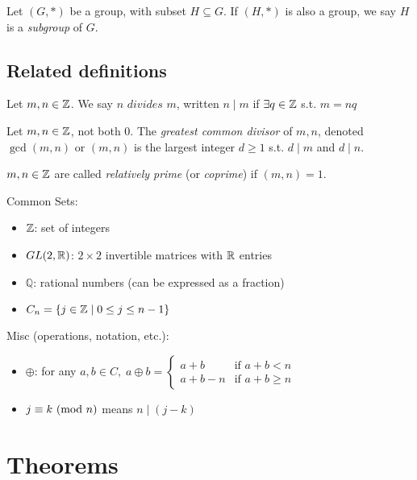  Let $(G, \ast)$ be a group, with subset $H \subseteq G$. If $(H, \ast)$ is also a group, we say $H$ is a \textit{subgroup} of $G$.

\subsection*{Related definitions}

 Let $m, n \in \mathbb{Z}$. We say $n \textit{ divides } m$, written $n \mid m$ if $\exists q \in \mathbb{Z}$ s.t. $m = nq$

 Let $m, n \in \mathbb{Z}$, not both $0$. The \textit{greatest common divisor} of $m, n$, denoted $\gcd(m, n)$ or $(m, n)$ is the largest integer $d \ge 1$ s.t. $d \mid m$ and $d \mid n$.

 $m, n \in \mathbb{Z}$ are called \textit{relatively prime} (or \textit{coprime}) if $(m, n) = 1$. 

\bigskip 

\noindent
Common Sets:
\begin{itemize}
    \item $\mathbb{Z}$: set of integers 
    \item $GL(2, \mathbb{R})$: $2 \times 2$ invertible matrices with $\mathbb{R}$ entries
    \item $\mathbb{Q}$: rational numbers (can be expressed as a fraction)
    \item $C_n = \{j \in \mathbb{Z} \mid 0 \le j \le n - 1 \}$
\end{itemize}

\bigskip

\noindent
Misc (operations, notation, etc.):
\begin{itemize}
    \item $\oplus$: for any $a, b \in C, \; a \oplus b = 
    \begin{cases}
        a + b & \text{if } a + b < n \\
        a + b - n & \text{if } a + b \ge n
    \end{cases}$
    \item $j \equiv k \text{ (mod } n)$ means $n \mid (j - k)$
\end{itemize}

\pagebreak

\section*{Theorems}

